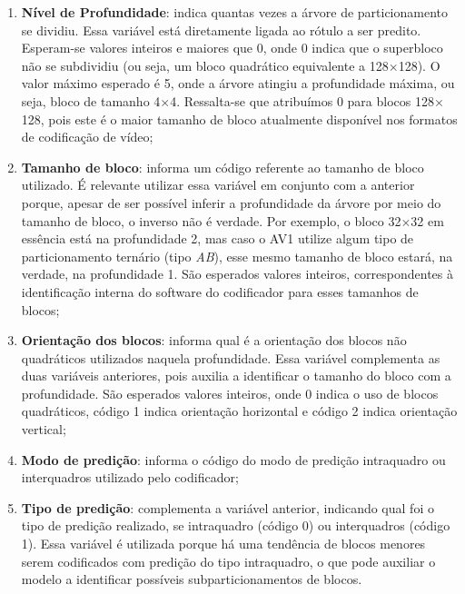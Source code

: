 \begin{enumerate}[1.]
    \item \textbf{Nível de Profundidade}: indica quantas vezes a árvore de particionamento se dividiu. Essa variável está diretamente ligada ao rótulo a ser predito. Esperam-se valores inteiros e maiores que 0, onde 0 indica que o superbloco não se subdividiu (ou seja, um bloco quadrático equivalente a 128$\times$128). O valor máximo esperado é 5, onde a árvore atingiu a profundidade máxima, ou seja, bloco de tamanho 4$\times$4. Ressalta-se que atribuímos 0 para blocos 128$\times$128, pois este é o maior tamanho de bloco atualmente disponível nos formatos de codificação de vídeo;

    \item \textbf{Tamanho de bloco}: informa um código referente ao tamanho de bloco utilizado. É relevante utilizar essa variável em conjunto com a anterior porque, apesar de ser possível inferir a profundidade da árvore por meio do tamanho de bloco, o inverso não é verdade. Por exemplo, o bloco 32$\times$32 em essência está na profundidade 2, mas caso o AV1 utilize algum tipo de particionamento ternário (tipo \textit{AB}), esse mesmo tamanho de bloco estará, na verdade, na profundidade 1. São esperados valores inteiros, correspondentes à identificação interna do software do codificador para esses tamanhos de blocos;

    \item \textbf{Orientação dos blocos}: informa qual é a orientação dos blocos não quadráticos utilizados naquela profundidade. Essa variável complementa as duas variáveis anteriores, pois auxilia a identificar o tamanho do bloco com a profundidade. São esperados valores inteiros, onde 0 indica o uso de blocos quadráticos, código 1 indica orientação horizontal e código 2 indica orientação vertical; 

    \item \textbf{Modo de predição}: informa o código do modo de predição intraquadro ou interquadros utilizado pelo codificador;

    \item \textbf{Tipo de predição}: complementa a variável anterior, indicando qual foi o tipo de predição realizado, se intraquadro (código 0) ou interquadros (código 1). Essa variável é utilizada porque há uma tendência de blocos menores serem codificados com predição do tipo intraquadro, o que pode auxiliar o modelo a identificar possíveis subparticionamentos de blocos.
\end{enumerate}

